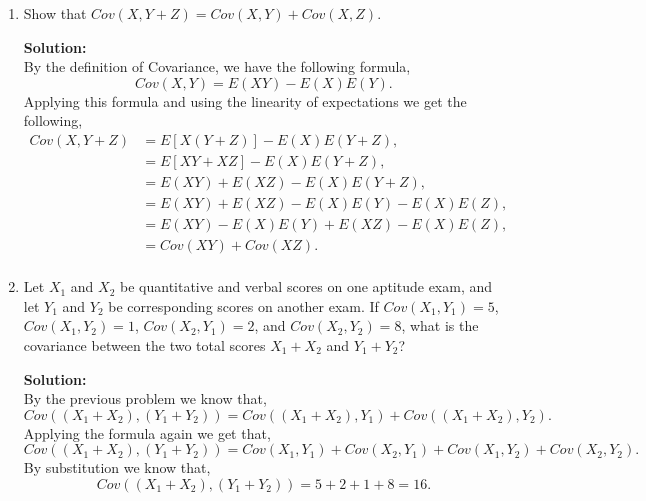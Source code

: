 \documentclass[12pt]{article}
\makeatletter
\theoremstyle{homework}
\newenvironment{exercise}[1]
{\def\@currentlabel{#1}\exercisecore}
{\endexercisecore}
\newcommand{\localhead}[1]{\par\smallskip\noindent\textbf{#1}\nobreak\\}%
\newcommand\solution{\localhead{Solution:}}
\makeatother
\begin{document}
\begin{exercise}{5.92} 
  \begin{enumerate}
    \item Show that $Cov(X, Y + Z) = Cov(X,Y) + Cov(X, Z)$.\\
    
    \solution By the definition of Covariance, we have the following formula,
    \begin{equation*}
      Cov(X,Y) = E(XY) - E(X)E(Y).
    \end{equation*}
    Applying this formula and using the linearity of expectations we get the following,
    \begin{align*}
      Cov(X, Y + Z) &= E[X(Y + Z)] - E(X)E(Y + Z),\\
      &= E[XY + XZ] - E(X)E(Y + Z),\\
      &= E(XY) + E(XZ) - E(X)E(Y + Z),\\
      &= E(XY) + E(XZ) - E(X)E(Y) - E(X)E(Z),\\
      &= E(XY) - E(X)E(Y) + E(XZ) - E(X)E(Z),\\
      &= Cov(XY) + Cov(XZ).\\
    \end{align*}
    \vspace{.25in}


    \item Let $X_1$ and $X_2$ be quantitative and verbal scores on one aptitude exam, and let $Y_1$ and $Y_2$
      be  corresponding  scores  on  another  exam. If  $Cov(X_1,  Y_1) = 5$, $Cov(X_1, Y_2) = 1$, $Cov(X_2, Y_1) = 2$, 
      and $Cov(X_2, Y_2) = 8$, what is the covariance between the two total scores $X_1 + X_2$ and $Y_1 + Y_2$?\\

      \solution By the previous problem we know that,
      \begin{equation*}
        Cov((X_1 + X_2), (Y_1 + Y_2)) = Cov((X_1 + X_2), Y_1) + Cov((X_1 + X_2), Y_2). 
      \end{equation*}
      Applying the formula again we get that,
      \begin{equation*}
        Cov((X_1 + X_2), (Y_1 + Y_2)) = Cov(X_1, Y_1) + Cov(X_2, Y_1) + Cov(X_1, Y_2) + Cov(X_2, Y_2). 
      \end{equation*}
      By substitution we know that,
      \begin{equation*}
        Cov((X_1 + X_2), (Y_1 + Y_2)) = 5 + 2 + 1 + 8 = 16.
      \end{equation*}
    \end{enumerate}
\end{exercise}
\vspace{.5in}
\end{document}
